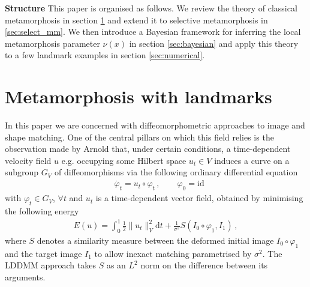 \documentclass[runningheads]{llncs}
\newcommand{\half}{\frac 12}
\newcommand{\norm}[2]{\| #1 \|_{ #2 }}
\newcommand{\vnorm}[1]{\norm{ #1 }{V}}
\newcommand{\diff}[1]{\text{d} #1}
\begin{document}
{\bf Structure} This paper is organised as follows. We review the theory of
classical metamorphosis in section \ref{sec:bg} and extend it to selective
metamorphosis in \ref{sec:select_mm}.  We then introduce a Bayesian framework
for inferring the local metamorphosis parameter $\nu(x)$ in section
\ref{sec:bayesian} and apply this theory to a few landmark examples in section
\ref{sec:numerical}.

\section{Metamorphosis with landmarks}\label{sec:bg}

In this paper we are concerned with diffeomorphometric approaches to image and
shape matching. One of the central pillars on which this field relies is the
observation made by Arnold \cite{arnold1966geometrie} that, under certain
conditions, a time-dependent velocity field $u$ e.g. occupying some Hilbert
space $u_t \in V$ induces a curve on a subgroup $G_V$ of diffeomorphisms
\cite{younes2010shapes} via the following ordinary differential equation
\begin{align}
& \dot{\varphi_t} = u_t \circ \varphi_t\, , \qquad  \varphi_0 = \text{id}
  \label{diffeo}
\end{align}
with $\varphi_t \in G_V$, $\forall t$ and $u_t$ is a time-dependent vector
field, obtained by minimising the following energy
\begin{align}
  E(u) = \int_0^1 \half\vnorm{u_t}^2 \diff{t} + \frac{1}{\sigma^2}
  S(I_0\circ\varphi_1, I_1)\, , \label{E-def}
\end{align}
where $S$ denotes a similarity measure between the deformed initial image
$I_0\circ \varphi_1$ and the target image $I_1$ to allow inexact matching
parametrised by $\sigma^2$. The LDDMM approach takes $S$ as an $L^2$ norm on
the difference between its arguments.\\
\end{document}
